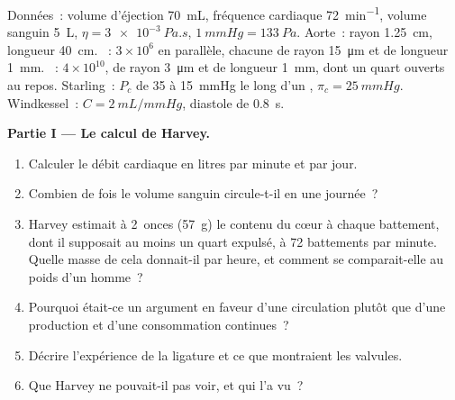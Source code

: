 \begin{problem}
\label{pb:b2:blood-circulation:1}
Données~: volume d'éjection \qty{70}{mL}, fréquence cardiaque
\qty{72}{min^{-1}}, volume sanguin \qty{5}{L}, $\eta = \qty{3e-3}{Pa.s}$,
$\qty{1}{mmHg} =
\qty{133}{Pa}$. Aorte~: rayon \qty{1.25}{cm}, longueur \qty{40}{cm}.
~: $3\times 10^{6}$ en parallèle, chacune de rayon
\qty{15}{\micro m} et de longueur \qty{1}{mm}. ~: $4\times
10^{10}$, de rayon \qty{3}{\micro m} et de longueur \qty{1}{mm}, dont un
quart ouverts au repos. Starling~: $P_c$ de 35 à \qty{15}{mmHg} le long
d'un , $\pi_c = \qty{25}{mmHg}$. Windkessel~: $C =
\qty{2}{mL/mmHg}$, diastole de \qty{0.8}{s}.

\medskip
\noindent\textbf{Partie I --- Le calcul de Harvey.}
\begin{enumerate}
  \item Calculer le débit cardiaque en litres par minute et par jour.
  \item Combien de fois le volume sanguin circule-t-il en une journée~?
  \item Harvey estimait à 2~onces (\qty{57}{g}) le contenu du cœur à
        chaque battement, dont il supposait au moins un quart expulsé,
        à 72 battements par minute. Quelle masse de  cela
        donnait-il par heure, et comment se comparait-elle au poids
        d'un homme~?
  \item Pourquoi était-ce un argument en faveur d'une circulation
        plutôt que d'une production et d'une consommation continues~?
  \item Décrire l'expérience de la ligature et ce que montraient les
        valvules.
  \item Que Harvey ne pouvait-il pas voir, et qui l'a vu~?
\end{enumerate}


\end{problem}
